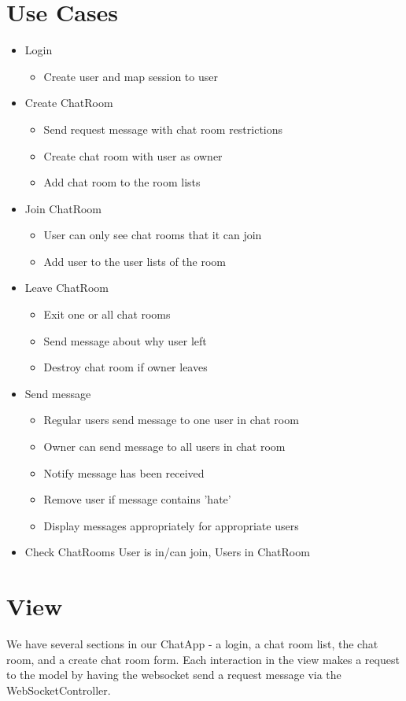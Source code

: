 \documentclass[letterpaper, 11pt]{article}
\begin{document}
\section{Use Cases}
\begin{itemize}
  \item Login
  \begin{itemize}
    \item Create user and map session to user
     \end{itemize}
  \item Create ChatRoom
  \begin{itemize}
    \item Send request message with chat room restrictions
    \item Create chat room with user as owner
    \item Add chat room to the room lists
      \end{itemize}
  \item Join ChatRoom
  \begin{itemize}
    \item User can only see chat rooms that it can join
    \item Add user to the user lists of the room
  \end{itemize}
  \item Leave ChatRoom
  \begin{itemize}
    \item Exit one or all chat rooms
    \item Send message about why user left
    \item Destroy chat room if owner leaves
  \end{itemize}
  \item Send message
  \begin{itemize}
    \item Regular users send message to one user in chat room
    \item Owner can send message to all users in chat room
    \item Notify message has been received
    \item Remove user if message contains 'hate'
    \item Display messages appropriately for appropriate users
  \end{itemize}
  \item Check ChatRooms User is in/can join, Users in ChatRoom
\end{itemize}

\section{View}
We have several sections in our ChatApp - a login, a chat room list, the chat room, and a create chat room form. Each interaction in the view makes a request to the model by having the websocket send a request message via the WebSocketController.
\end{document}
